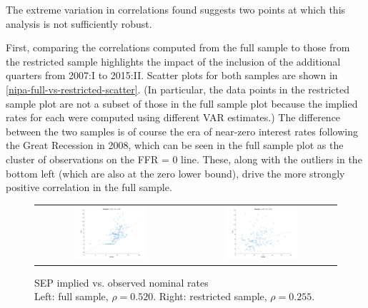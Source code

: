 The extreme variation in correlations found suggests two points at which this analysis is not sufficiently robust.

First, comparing the correlations computed from the full sample to those from the restricted sample highlights the impact of the inclusion of the additional quarters from 2007:I to 2015:II. Scatter plots for both samples are shown in \autoref{nipa-full-vs-restricted-scatter}. (In particular, the data points in the restricted sample plot are not a subset of those in the full sample plot because the implied rates for each were computed using different VAR estimates.) The difference between the two samples is of course the era of near-zero interest rates following the Great Recession in 2008, which can be seen in the full sample plot as the cluster of observations on the FFR = 0 line. These, along with the outliers in the bottom left (which are also at the zero lower bound), drive the more strongly positive correlation in the full sample.

\begin{figure}[t]
\centering
\captionsetup{singlelinecheck=false, justification=centering}
\caption{SEP implied vs. observed nominal rates \\ Left: full sample, $\rho = 0.520$. Right: restricted sample, $\rho = 0.255$.}
\label{nipa-full-vs-restricted-scatter}
\begin{tabular}{cc}
\includegraphics[width=0.5\textwidth]{figs/nipa/scatter/nominal_sep} &
\includegraphics[width=0.5\textwidth]{figs/nipa/scatter/nominal_sep_collard} \\
\end{tabular}
\end{figure}

